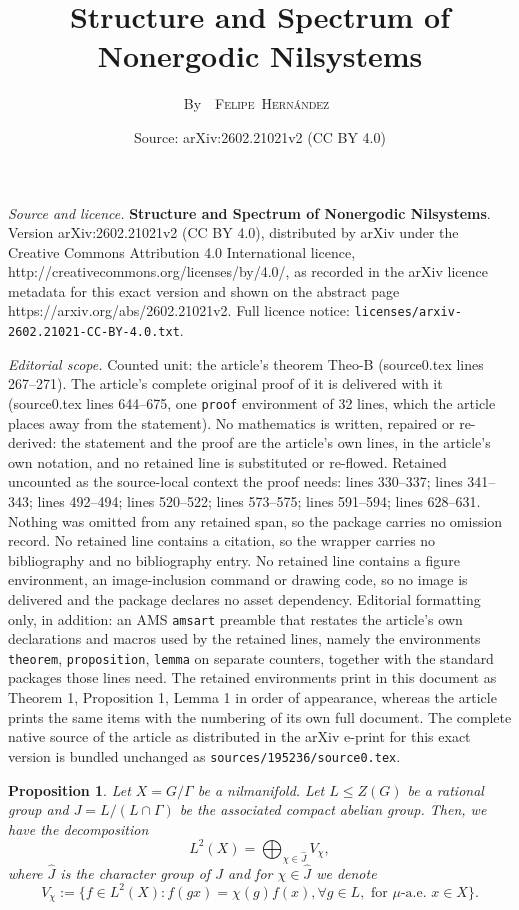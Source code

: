 \documentclass[10pt,a4paper]{amsart}
\title{{\bfseries Structure and Spectrum of Nonergodic Nilsystems}}
\author{By~~{\scshape Felipe~Hernández~}}
\date{Source: arXiv:2602.21021v2 (CC BY 4.0)}
\newtheorem{proposition}{Proposition}
\begin{document}
\maketitle

\noindent\emph{Source and licence.} {\bfseries Structure and Spectrum of Nonergodic Nilsystems}. Version arXiv:2602.21021v2 (CC BY 4.0), distributed by arXiv under the Creative Commons Attribution 4.0 International licence, http://creativecommons.org/licenses/by/4.0/, as recorded in the arXiv licence metadata for this exact version and shown on the abstract page https://arxiv.org/abs/2602.21021v2. Full licence notice: \texttt{licenses/arxiv-2602.21021-CC-BY-4.0.txt}.\par\smallskip

\noindent\textit{Editorial scope.} Counted unit: the article's theorem Theo-B (source0.tex lines 267--271). The article's complete original proof of it is delivered with it (source0.tex lines 644--675, one \texttt{proof} environment of 32 lines, which the article places away from the statement). No mathematics is written, repaired or re-derived: the statement and the proof are the article's own lines, in the article's own notation, and no retained line is substituted or re-flowed.  Retained uncounted as the source-local context the proof needs: lines 330--337; lines 341--343; lines 492--494; lines 520--522; lines 573--575; lines 591--594; lines 628--631.  Nothing was omitted from any retained span, so the package carries no omission record.  No retained line contains a citation, so the wrapper carries no bibliography and no bibliography entry.  No retained line contains a figure environment, an image-inclusion command or drawing code, so no image is delivered and the package declares no asset dependency.  Editorial formatting only, in addition: an AMS \texttt{amsart} preamble that restates the article's own declarations and macros used by the retained lines, namely the environments \texttt{theorem}, \texttt{proposition}, \texttt{lemma} on separate counters, together with the standard packages those lines need.  The retained environments print in this document as Theorem 1, Proposition 1, Lemma 1 in order of appearance, whereas the article prints the same items with the numbering of its own full document.  The complete native source of the article as distributed in the arXiv e-print for this exact version is bundled unchanged as \texttt{sources/195236/source0.tex}.
\begin{proposition}\label{PW}
    Let $X=G/\Gamma$ be a nilmanifold. Let $L\leq Z(G)$ be a rational group and $J=L/(L\cap \Gamma)$ be the associated compact abelian group. Then, we have the decomposition 
    $$L^2(X)=\bigoplus_{\chi\in \widehat{J}}V_\chi, $$
    where $\widehat{J}$ is the character group of $J$ and for $\chi\in \widehat{J}$ we denote 
    \begin{equation}\label{def-V-chi}
       V_\chi:=\{ f\in L^2(X) : f(gx)= \chi(g)f(x), \forall g\in L, \text{ for }\mu\text{-a.e. } x\in X\}.  
    \end{equation}
\end{proposition}
\end{document}
